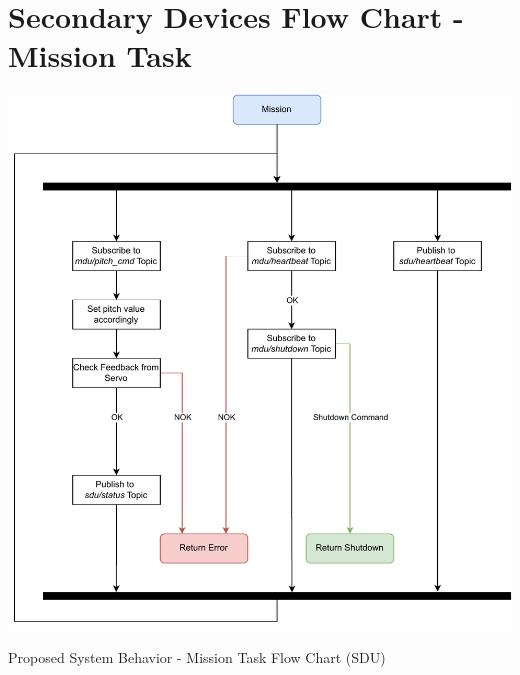 
\chapter{Secondary Devices Flow Chart - Mission Task} %

\label{AppendixF}

\begin{algorithm}[H]
    \centering
    \includegraphics[scale=0.85]{appendices/assets/SDU_MISSION.pdf}
    \caption{Proposed System Behavior - Mission Task Flow Chart (SDU)}
    \label{alg:SDU_MISSION}
\end{algorithm}

